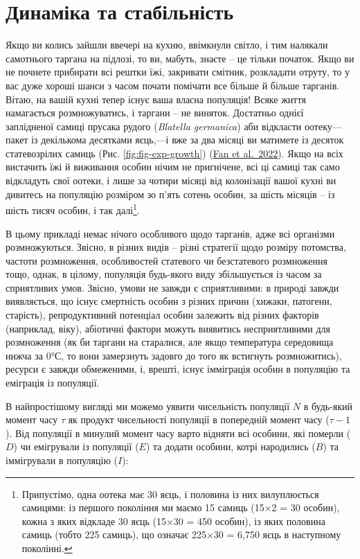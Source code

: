 \documentclass[
  11pt,
]{book}
\begin{document}
\section{Динаміка та стабільність}\label{pop-dynamics}

Якщо ви колись зайшли ввечері на кухню, ввімкнули світло, і тим налякали самотнього таргана на підлозі, то ви, мабуть, знаєте -- це тільки початок. Якщо ви не почнете прибирати всі рештки їжі, закривати смітник, розкладати отруту, то у вас дуже хороші шанси з часом почати помічати все більше й більше тарганів. Вітаю, на вашій кухні тепер існує ваша власна популяція! Всяке життя намагається розмножуватись, і таргани -- не виняток. Достатньо однієї заплідненої самиці прусака рудого (\emph{Blatella germanica}) аби відкласти оотеку---пакет із декількома десятками яєць,---і вже за два місяці ви матимете із десяток статевозрілих самиць (Рис. \ref{fig:fig-exp-growth}) (\href{https://doi.org/10.1093/jme/tjac036}{Fan et al.~2022}). Якщо на всіх вистачить їжі й виживання особин нічим не пригнічене, всі ці самиці так само відкладуть свої оотеки, і лише за чотири місяці від колонізації вашої кухні ви дивитесь на популяцію розміром зо п'ять сотень особин, за шість місяців -- із шість тисяч особин, і так далі\footnote{Припустімо, одна оотека має 30 яєць, і половина із них вилуплюється самицями: із першого покоління ми маємо 15 самиць (15×2 = 30 особин), кожна з яких відкладе 30 яєць (15×30 = 450 особин), із яких половина самиць (тобто 225 самиць), що означає 225×30 = 6,750 яєць в наступному поколінні.}.

В цьому прикладі немає нічого особливого щодо тарганів, адже всі організми розмножуються. Звісно, в різних видів -- різні стратегії щодо розміру потомства, частоти розмноження, особливостей статевого чи безстатевого розмноження тощо, однак, в цілому, популяція будь-якого виду збільшується із часом за сприятливих умов. Звісно, умови не завжди є сприятливими: в природі завжди виявляється, що існує смертність особин з різних причин (хижаки, патогени, старість), репродуктивний потенціал особин залежить від різних факторів (наприклад, віку), абіотичні фактори можуть виявитись несприятливими для розмноження (як би таргани на старалися, але якщо температура середовища нижча за 0°С, то вони замерзнуть задовго до того як встигнуть розмножитись), ресурси є завжди обмеженими, і, врешті, існує імміграція особин в популяцію та еміграція із популяції.

В найпростішому вигляді ми можемо уявити чисельність популяції \(N\) в будь-який момент часу \(\tau\) як продукт чисельності популяції в попередній момент часу (\(\tau-1\)). Від популяції в минулий момент часу варто відняти всі особини, які померли (\(D\)) чи емігрували із популяції (\(E\)) та додати особини, котрі народились (\(B\)) та іммігрували в популяцію (\(I\)):
\end{document}
